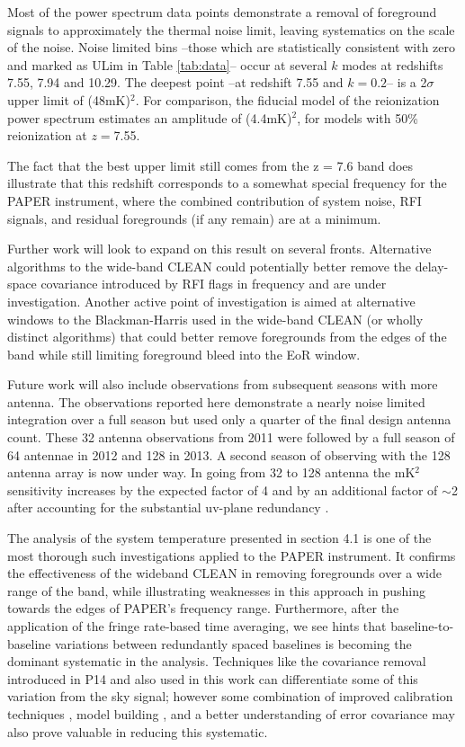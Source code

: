 \documentclass[preprint]{aastex}
\begin{document}
Most of the power spectrum data points demonstrate a removal of foreground signals to approximately the thermal noise limit, leaving systematics on the scale of the noise. Noise limited bins --those which are statistically consistent with zero and marked as ULim in Table \ref{tab:data}-- occur at several $k$ modes at redshifts 7.55, 7.94 and 10.29. The deepest point --at redshift 7.55 and $k=0.2$-- is a 2$\sigma$ upper limit of (48mK)$^2$. For comparison, the \citet{Lidz:2008p8251} fiducial model of the reionization power spectrum estimates an amplitude of (4.4mK)$^2$, for models with 50\% reionization at $z=$7.55. 


The fact that the best upper limit still comes from the z = 7.6 band does illustrate that this redshift corresponds to a somewhat special frequency for the PAPER instrument, where the combined contribution of system noise, RFI signals, and residual foregrounds (if any remain) are at a minimum.  


Further work will look to expand on this result on several fronts.  Alternative algorithms to the wide-band CLEAN could potentially better remove the delay-space covariance introduced by RFI flags in frequency and are under investigation.  Another active point of investigation is aimed at alternative windows to the Blackman-Harris used in the wide-band CLEAN (or wholly distinct algorithms) that could better remove foregrounds from the edges of the band while still limiting foreground bleed into the EoR window.  

Future work will also include observations from subsequent seasons with more antenna.  The observations reported here demonstrate a nearly noise limited integration over a full season but used only a quarter of the final design antenna count. These  32 antenna observations from 2011 were followed by a full season of 64 antennae in 2012 and 128 in 2013.  A second season of observing with the 128 antenna array is now under way. In going from  32 to 128 antenna the mK$^2$ sensitivity increases by the expected factor of 4 and by an additional factor of $\sim$2 after accounting for the substantial uv-plane redundancy \citep{Parsons:2012p9028}. 

The analysis of the system temperature presented in section 4.1 is one of the most thorough such investigations applied to the PAPER instrument.  It confirms the effectiveness of the wideband CLEAN in removing foregrounds over a wide range of the band, while illustrating weaknesses in this approach in pushing towards the edges of PAPER's frequency range.  Furthermore, after the application of the fringe rate-based time averaging, we see hints that baseline-to-baseline variations between redundantly spaced baselines is becoming the dominant systematic in the analysis.  Techniques like the covariance removal introduced in P14 and also used in this work can differentiate some of this variation from the sky signal; however some combination of improved calibration techniques \citep{Zheng:2014p10467}, model building \citep{Sullivan:2012p9457}, and a better understanding of error covariance  \citep{Liu:2011p8763} may also prove valuable in reducing this systematic.
\end{document}
